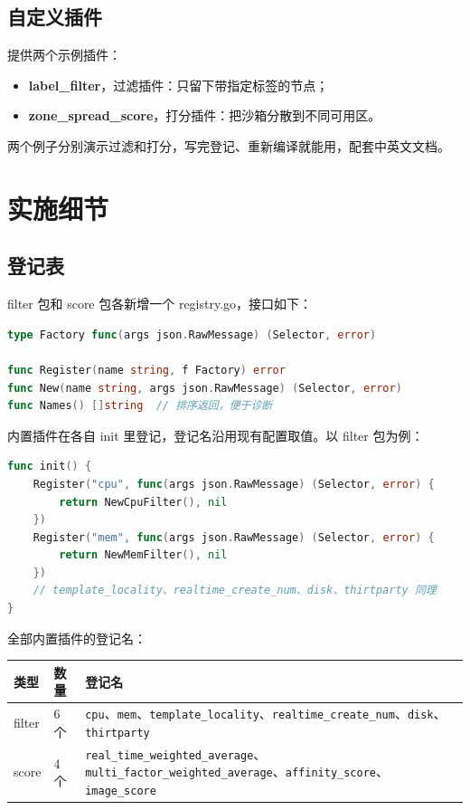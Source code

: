 \documentclass[UTF8,fontset=none,zihao=-4]{ctexart}
\newcommand{\code}[1]{\colorbox{gray!12}{\texttt{#1}}}
\begin{document}
\subsection*{自定义插件}

提供两个示例插件：

\begin{itemize}
  \item \textbf{label\_filter}，过滤插件：只留下带指定标签的节点；
  \item \textbf{zone\_spread\_score}，打分插件：把沙箱分散到不同可用区。
\end{itemize}

两个例子分别演示过滤和打分，写完登记、重新编译就能用，配套中英文文档。

\section{实施细节}

\subsection*{登记表}

filter 包和 score 包各新增一个 registry.go，接口如下：

\begin{lstlisting}[language=go]
type Factory func(args json.RawMessage) (Selector, error)

func Register(name string, f Factory) error
func New(name string, args json.RawMessage) (Selector, error)
func Names() []string  // 排序返回，便于诊断
\end{lstlisting}

内置插件在各自 init 里登记，登记名沿用现有配置取值。以 filter 包为例：

\begin{lstlisting}[language=go]
func init() {
    Register("cpu", func(args json.RawMessage) (Selector, error) {
        return NewCpuFilter(), nil
    })
    Register("mem", func(args json.RawMessage) (Selector, error) {
        return NewMemFilter(), nil
    })
    // template_locality、realtime_create_num、disk、thirtparty 同理
}
\end{lstlisting}

全部内置插件的登记名：

\begin{table}[H]
\centering\small
\begin{tabularx}{\textwidth}{L{0.15\textwidth}L{0.30\textwidth}L{0.55\textwidth}}
\toprule
\textbf{类型} & \textbf{数量} & \textbf{登记名} \\
\midrule
filter & 6 个 & \code{cpu}、\code{mem}、\code{template\_locality}、\code{realtime\_create\_num}、\code{disk}、\code{thirtparty} \\
score & 4 个 & \code{real\_time\_weighted\_average}、\code{multi\_factor\_weighted\_average}、\code{affinity\_score}、\code{image\_score} \\
\bottomrule
\end{tabularx}
\end{table}
\end{document}
